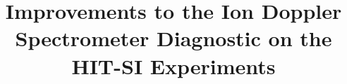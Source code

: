 \documentclass[%
 aip,
rsi,%
 amsmath,amssymb,
 reprint,%
]{revtex4-1}
\usepackage{amsmath}
\usepackage{amssymb}
\usepackage{graphicx}
\usepackage{verbatim}
\usepackage{placeins}
\usepackage{multirow}
\usepackage{epstopdf}
\usepackage{natbib}






\title{Improvements to the Ion Doppler Spectrometer Diagnostic on the HIT-SI Experiments}


